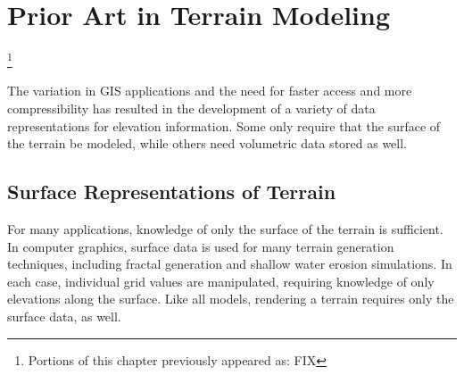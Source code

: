 \chapter{Prior Art in Terrain Modeling}
\label{chapter:TerrainRepresentations}



\let\thefootnote\relax\footnote{Portions of this chapter previously appeared as: FIX  }


The variation in GIS applications and the need for faster access and more compressibility 
has resulted in the development of a variety of data representations for elevation information. 
Some only require that the surface of the terrain be modeled, while others need volumetric data stored as well.


\section{Surface Representations of Terrain}
\label{section:SurfaceRepresentations}

For many applications, knowledge of only the surface of the terrain is sufficient. In computer graphics, surface data is used for many terrain generation techniques, including fractal generation and shallow water erosion simulations.
In each case, individual grid values are manipulated, requiring knowledge of only elevations along the surface. 
Like all models, rendering a terrain requires only the surface data, as well.

